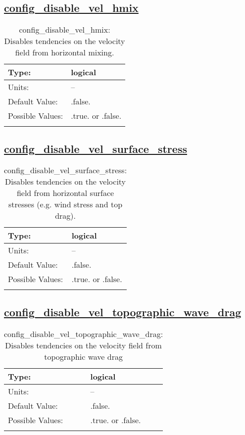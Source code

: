 \subsection[config\_disable\_vel\_hmix]{\hyperref[sec:nm_tab_debug]{config\_disable\_vel\_hmix}}
\label{subsec:nm_sec_config_disable_vel_hmix}
\begin{center}
\begin{longtable}{| p{2.0in} || p{4.0in} |}
    \hline
    Type: & logical \\
    \hline
    Units: & -- \\
    \hline
    Default Value: & .false. \\
    \hline
    Possible Values: & .true. or .false. \\
    \hline
    \caption{config\_disable\_vel\_hmix: Disables tendencies on the velocity field from horizontal mixing.}
\end{longtable}
\end{center}
\subsection[config\_disable\_vel\_surface\_stress]{\hyperref[sec:nm_tab_debug]{config\_disable\_vel\_surface\_stress}}
\label{subsec:nm_sec_config_disable_vel_surface_stress}
\begin{center}
\begin{longtable}{| p{2.0in} || p{4.0in} |}
    \hline
    Type: & logical \\
    \hline
    Units: & -- \\
    \hline
    Default Value: & .false. \\
    \hline
    Possible Values: & .true. or .false. \\
    \hline
    \caption{config\_disable\_vel\_surface\_stress: Disables tendencies on the velocity field from horizontal surface stresses (e.g. wind stress and top drag).}
\end{longtable}
\end{center}
\subsection[config\_disable\_vel\_topographic\_wave\_drag]{\hyperref[sec:nm_tab_debug]{config\_disable\_vel\_topographic\_wave\_drag}}
\label{subsec:nm_sec_config_disable_vel_topographic_wave_drag}
\begin{center}
\begin{longtable}{| p{2.0in} || p{4.0in} |}
    \hline
    Type: & logical \\
    \hline
    Units: & -- \\
    \hline
    Default Value: & .false. \\
    \hline
    Possible Values: & .true. or .false. \\
    \hline
    \caption{config\_disable\_vel\_topographic\_wave\_drag: Disables tendencies on the velocity field from topographic wave drag}
\end{longtable}
\end{center}
